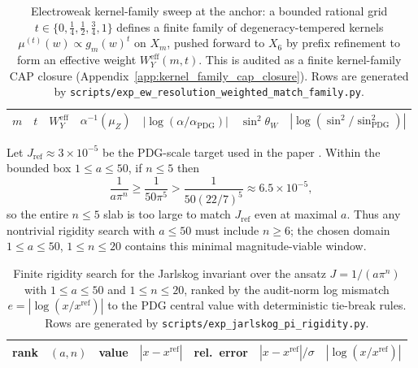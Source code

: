 \begin{table}[H]
\centering
\scriptsize
\setlength{\tabcolsep}{6pt}
\renewcommand{\arraystretch}{1.15}
\begin{tabular}{r r r r r r r}
\toprule
$m$ & $t$ & $W_Y^{\mathrm{eff}}$ & $\alpha^{-1}(\mu_Z)$ & $|\log(\alpha/\alpha_{\mathrm{PDG}})|$ & $\sin^2\theta_W$ & $|\log(\sin^2/\sin^2_{\mathrm{PDG}})|$ \\
\midrule
%
\end{tabular}
\caption{Electroweak kernel-family sweep at the anchor: a bounded rational grid $t\in\{0,\tfrac14,\tfrac12,\tfrac34,1\}$ defines a finite family of degeneracy-tempered kernels $\mu^{(t)}(w)\propto g_m(w)^t$ on $X_m$, pushed forward to $X_6$ by prefix refinement to form an effective weight $W_Y^{\mathrm{eff}}(m,t)$.
This is audited as a finite kernel-family CAP closure (Appendix~\ref{app:kernel_family_cap_closure}).
Rows are generated by \texttt{scripts/exp\_ew\_resolution\_weighted\_match\_family.py}.}
\label{tab:ew_kernel_family_sweep_anchor}
\end{table}

\begin{remark}\label{rem:jarlskog_box_nonvacuous}
Let $J_{\mathrm{ref}}\approx 3\times 10^{-5}$ be the PDG-scale target used in the paper \cite{PDGRPP2024}.
Within the bounded box $1\le a\le 50$, if $n\le 5$ then
\[
\frac{1}{a\pi^n}\ge \frac{1}{50\pi^5}>\frac{1}{50(22/7)^5}\approx 6.5\times 10^{-5},
\]
so the entire $n\le 5$ slab is too large to match $J_{\mathrm{ref}}$ even at maximal $a$.
Thus any nontrivial rigidity search with $a\le 50$ must include $n\ge 6$; the chosen domain $1\le a\le 50$, $1\le n\le 20$ contains this minimal magnitude-viable window.
\end{remark}

\begin{table}[H]
\centering
\scriptsize
\setlength{\tabcolsep}{8pt}
\renewcommand{\arraystretch}{1.15}
\begin{tabular}{rllrrrr}
\toprule
rank & $(a,n)$ & value & $|x-x^{\mathrm{ref}}|$ & rel.\ error & $|x-x^{\mathrm{ref}}|/\sigma$ & $|\log(x/x^{\mathrm{ref}})|$ \\
\midrule
%
\end{tabular}
\caption{Finite rigidity search for the Jarlskog invariant over the ansatz $J=1/(a\pi^n)$ with $1\le a\le 50$ and $1\le n\le 20$, ranked by the audit-norm log mismatch $e=|\log(x/x^{\mathrm{ref}})|$ to the PDG central value with deterministic tie-break rules. Rows are generated by \texttt{scripts/exp\_jarlskog\_pi\_rigidity.py}.}
\label{tab:jarlskog_pi_rigidity}
\end{table}


